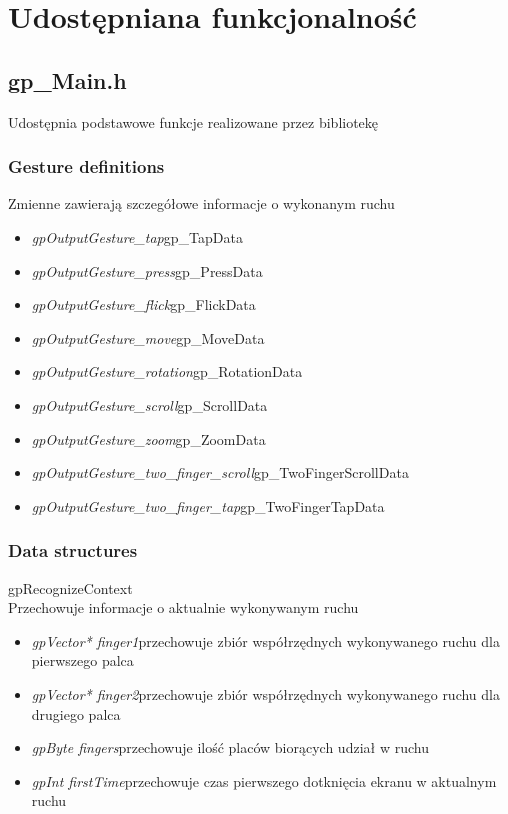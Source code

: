 \section{Udostępniana funkcjonalność}
\subsection{gp_Main.h}
Udostępnia podstawowe funkcje realizowane przez bibliotekę
\subsubsection{Gesture definitions} Zmienne zawierają szczegółowe informacje o wykonanym ruchu

\begin{itemize}
\item \textit{gpOutputGesture_tap}\quad gp_TapData
\item \textit{gpOutputGesture_press}\quad gp_PressData
\item \textit{gpOutputGesture_flick}\quad gp_FlickData
\item \textit{gpOutputGesture_move}\quad gp_MoveData
\item \textit{gpOutputGesture_rotation}\quad gp_RotationData
\item \textit{gpOutputGesture_scroll}\quad gp_ScrollData
\item \textit{gpOutputGesture_zoom}\quad gp_ZoomData
\item \textit{gpOutputGesture_two_finger_scroll}\quad gp_TwoFingerScrollData
\item \textit{gpOutputGesture_two_finger_tap}\quad gp_TwoFingerTapData
\end{itemize}
\subsubsection{Data structures}
\textsf{gpRecognizeContext} \\ \indent Przechowuje informacje o aktualnie wykonywanym ruchu
	\begin{itemize}
		\item \textit{gpVector* finger1}\quad przechowuje zbiór współrzędnych wykonywanego ruchu dla pierwszego palca
		\item \textit{gpVector* finger2}\quad przechowuje zbiór współrzędnych wykonywanego ruchu dla drugiego palca
		\item \textit{gpByte fingers}\quad przechowuje ilość placów biorących udział w ruchu
		\item \textit{gpInt firstTime}\quad przechowuje czas pierwszego dotknięcia ekranu w aktualnym ruchu
	\end{itemize}
\ \\
